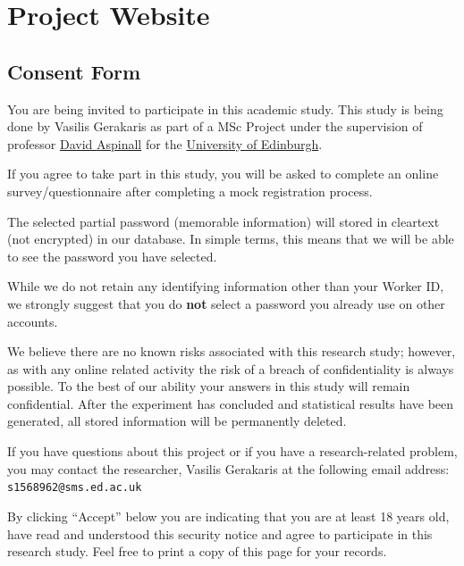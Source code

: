 
\chapter{Project Website}
  \label{ap:Website}

  \section{Consent Form}
    \label{aps:consent}
    You are being invited to participate in this academic study. This study is being done by Vasilis Gerakaris as part of a MSc Project under the supervision of professor \href{http://homepages.inf.ed.ac.uk/da/}{David Aspinall} for the \href{http://www.ed.ac.uk/}{University of Edinburgh}.

    If you agree to take part in this study, you will be asked to complete an online survey/questionnaire after completing a mock registration process.

    The selected partial password (memorable information) will stored in cleartext (not encrypted) in our database. In simple terms, this means that we will be able to see the password you have selected.

    While we do not retain any identifying information other than your Worker ID, we strongly suggest that you do \textbf{not} select a password you already use on other accounts.

    We believe there are no known risks associated with this research study; however, as with any online related activity the risk of a breach of confidentiality is always possible. To the best of our ability your answers in this study will remain confidential. After the experiment has concluded and statistical results have been generated, all stored information will be permanently deleted.

    If you have questions about this project or if you have a research-related problem, you may contact the researcher, Vasilis Gerakaris at the following email address: \texttt{s1568962@sms.ed.ac.uk}

    By clicking ``Accept'' below you are indicating that you are at least 18 years old, have read and understood this security notice and agree to participate in this research study. Feel free to print a copy of this page for your records.

